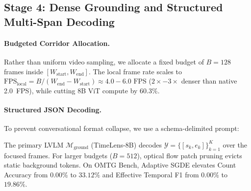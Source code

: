 
\subsection{Stage 4: Dense Grounding and Structured Multi-Span Decoding}
\label{sec:stage4}

\paragraph{Budgeted Corridor Allocation.} Rather than uniform video sampling, we allocate a fixed budget of $B = 128$ frames inside $[W_{\text{start}}, W_{\text{end}}]$. The local frame rate scales to $\text{FPS}_{\text{local}} = B / (W_{\text{end}} - W_{\text{start}}) \approx 4.0-6.0\text{ FPS}$ ($2\times-3\times$ denser than native 2.0~FPS), while cutting 8B ViT compute by $60.3\%$.

\paragraph{Structured JSON Decoding.} To prevent conversational format collapse, we use a schema-delimited prompt:
\begin{center}
\end{center}
The primary LVLM $\mathcal{M}_{\text{ground}}$ (TimeLens-8B) decodes $\mathcal{Y} = \{[s_k, e_k]\}_{k=1}^K$ over the focused frames. For larger budgets ($B=512$), optical flow patch pruning evicts static background tokens. On OMTG Bench, Adaptive SGDE elevates Count Accuracy from $0.00\%$ to $33.12\%$ and Effective Temporal F1 from $0.00\%$ to $19.86\%$.
